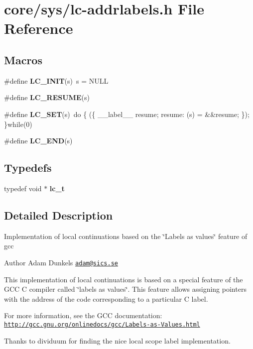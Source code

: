 \hypertarget{lc-addrlabels_8h}{\section{core/sys/lc-\/addrlabels.h File Reference}
\label{lc-addrlabels_8h}
}
\subsection*{Macros}
\begin{DoxyCompactItemize}
\item 
\hypertarget{group__lc_ga2c1bb4fa6d7a6ff951a41c73fc721109}{\#define {\bfseries L\-C\-\_\-\-I\-N\-I\-T}(s)~s = N\-U\-L\-L}\label{group__lc_ga2c1bb4fa6d7a6ff951a41c73fc721109}

\item 
\#define {\bfseries L\-C\-\_\-\-R\-E\-S\-U\-M\-E}(s)
\item 
\hypertarget{group__lc_gad8eec328a4868d767f0c00c8d1c6cfc1}{\#define {\bfseries L\-C\-\_\-\-S\-E\-T}(s)~do \{ (\{ \-\_\-\-\_\-label\-\_\-\-\_\- resume; resume\-: (s) = \&\&resume; \}); \}while(0)}\label{group__lc_gad8eec328a4868d767f0c00c8d1c6cfc1}

\item 
\hypertarget{group__lc_gaca51ceb2f5d855dfde55bcedf8d3b92d}{\#define {\bfseries L\-C\-\_\-\-E\-N\-D}(s)}\label{group__lc_gaca51ceb2f5d855dfde55bcedf8d3b92d}

\end{DoxyCompactItemize}
\subsection*{Typedefs}
\begin{DoxyCompactItemize}
\item 
\hypertarget{group__lc_ga2bdc4b7b4038454a79f1b2a94a6d2a98}{typedef void $\ast$ {\bfseries lc\-\_\-t}}\label{group__lc_ga2bdc4b7b4038454a79f1b2a94a6d2a98}

\end{DoxyCompactItemize}


\subsection{Detailed Description}
Implementation of local continuations based on the \char`\"{}\-Labels as
values\char`\"{} feature of gcc \begin{DoxyAuthor}{Author}
Adam Dunkels \href{mailto:adam@sics.se}{\tt adam@sics.\-se}
\end{DoxyAuthor}
This implementation of local continuations is based on a special feature of the G\-C\-C C compiler called \char`\"{}labels as values\char`\"{}. This feature allows assigning pointers with the address of the code corresponding to a particular C label.

For more information, see the G\-C\-C documentation\-: \href{http://gcc.gnu.org/onlinedocs/gcc/Labels-as-Values.html}{\tt http\-://gcc.\-gnu.\-org/onlinedocs/gcc/\-Labels-\/as-\/\-Values.\-html}

Thanks to dividuum for finding the nice local scope label implementation. 